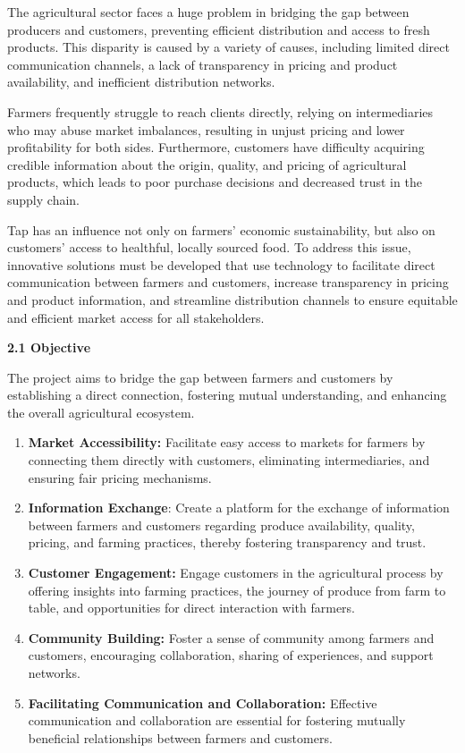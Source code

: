 \documentclass[
]{article}
\begin{document}
The agricultural sector faces a huge problem in bridging the gap between
producers and customers, preventing efficient distribution and access to
fresh products. This disparity is caused by a variety of causes,
including limited direct communication channels, a lack of transparency
in pricing and product availability, and inefficient distribution
networks.

Farmers frequently struggle to reach clients directly, relying on
intermediaries who may abuse market imbalances, resulting in unjust
pricing and lower profitability for both sides. Furthermore, customers
have difficulty acquiring credible information about the origin,
quality, and pricing of agricultural products, which leads to poor
purchase decisions and decreased trust in the supply chain.

Tap has an influence not only on farmers' economic sustainability, but
also on customers' access to healthful, locally sourced food. To address
this issue, innovative solutions must be developed that use technology
to facilitate direct communication between farmers and customers,
increase transparency in pricing and product information, and streamline
distribution channels to ensure equitable and efficient market access
for all stakeholders.

\textbf{2.1 Objective}

The project aims to bridge the gap between farmers and customers by
establishing a direct connection, fostering mutual understanding, and
enhancing the overall agricultural ecosystem.

\begin{enumerate}
\def\labelenumi{\arabic{enumi}.}
\item
  \textbf{Market Accessibility:} Facilitate easy access to markets for
  farmers by connecting them directly with customers, eliminating
  intermediaries, and ensuring fair pricing mechanisms.
\item
  \textbf{Information Exchange}: Create a platform for the exchange of
  information between farmers and customers regarding produce
  availability, quality, pricing, and farming practices, thereby
  fostering transparency and trust.
\item
  \textbf{Customer Engagement:} Engage customers in the agricultural
  process by offering insights into farming practices, the journey of
  produce from farm to table, and opportunities for direct interaction
  with farmers.
\item
  \textbf{Community Building:} Foster a sense of community among farmers
  and customers, encouraging collaboration, sharing of experiences, and
  support networks.
\item
  \textbf{Facilitating Communication and Collaboration:} Effective
  communication and collaboration are essential for fostering mutually
  beneficial relationships between farmers and customers.
\end{enumerate}
\end{document}
